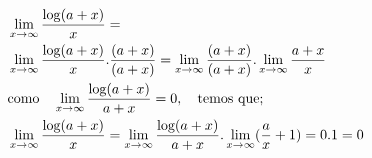 \begin{ex}
\begin{align}
&\lim_{x\rightarrow \infty} \frac{\log(a+x)}{x}=\nonumber\\
&\lim_{x\rightarrow \infty} \frac{\text{log}(a+x)}{x}.\frac{(a+x)}{(a+x)}=\lim_{x\rightarrow \infty} \frac{\text(a+x)}{(a+x)}.\lim_{x\rightarrow \infty} \frac{a+x}{x}\nonumber\\
&\text{como}\quad\lim_{x\rightarrow \infty} \frac{\text{log}(a+x)}{a+x}=0,\quad\text{temos que;}\nonumber\\
&\lim_{x\rightarrow \infty} \frac{\text{log}(a+x)}{x}=\lim_{x\rightarrow \infty} \frac{\text{log}(a+x)}{a+x}.\lim_{x\rightarrow \infty} (\frac{a}{x}+1)=0.1=0\nonumber
\end{align}
\end{ex}
